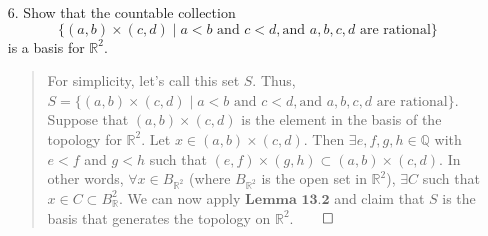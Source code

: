 \documentclass[12pt, a4paper]{article}
\newcommand{\rats}{\mathbb{Q}} %
\newcommand{\reals}{\mathbb{R}} %
\begin{document}
\begin{itemize}
\item[6.]
Show that the countable collection
$$\{(a, b) \times (c, d) \mid a < b \mbox{ and } c < d, \mbox{and } a,b,c,d \mbox{ are rational}\}$$
is a basis for $\reals^2$.
\begin{quote}
For simplicity, let's call this set $S$. Thus, $S = \{(a, b) \times (c, d) \mid a < b \mbox{ and } c < d, \mbox{and } a,b,c,d \mbox{ are rational}\}$.
\newline
\newline
Suppose that $(a, b) \times (c, d)$ is the element in the basis of the topology for $\reals^2$. Let $x \in (a, b) \times (c, d)$.
Then $\exists e, f, g, h \in \rats$ with $e < f$ and $g < h$ such that $(e, f) \times (g, h) \subset (a, b) \times (c, d)$.
In other words, $\forall x \in B_{\reals^2}$ (where $B_{\reals^2}$ is the open set in $\reals^2$), $\exists C$ such that
$x \in C \subset B_\reals^2$. We can now apply $\textbf{Lemma 13.2}$ and claim that $S$ is the basis that generates the topology on $\reals^2$.$\qed$
\end{quote}

\item[]
\item[]


\end{itemize}
\end{document}
